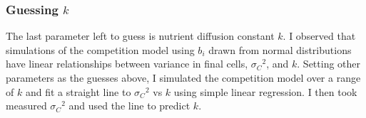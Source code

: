 
\subsubsection{\boldmath Guessing \(k\) \unboldmath}

The last parameter left to guess is nutrient diffusion constant
\(k\). I observed that simulations of the competition model using
\(b_{i}\) drawn from normal distributions have linear relationships
between variance in final cells, \({\sigma_{C}}^{2}\), and \(k\). Setting
other parameters as the guesses above, I simulated the competition
model
over a range of \(k\) and fit a straight line to \({\sigma_{C}}^{2}\)
vs \(k\) using simple linear regression. I then took measured
\({\sigma_{C}}^{2}\) and used the line to predict \(k\).




%


